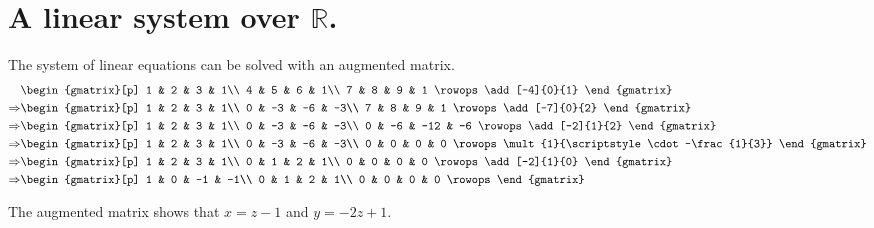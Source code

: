 \section{A linear system over $\mathbb{R}$.}
The system of linear equations can be solved with an augmented matrix.
\begin{align*}
    & \begin{gmatrix}[p]
        1 & 2 & 3 & 1\\
        4 & 5 & 6 & 1\\
        7 & 8 & 9 & 1
        \rowops
        \add[-4]{0}{1}
      \end{gmatrix} \\
    \Rightarrow 
    & \begin{gmatrix}[p]
        1 & 2 & 3 & 1\\
        0 & -3 & -6 & -3\\
        7 & 8 & 9 & 1
        \rowops
        \add[-7]{0}{2}
      \end{gmatrix} \\
    \Rightarrow 
    & \begin{gmatrix}[p]
        1 & 2 & 3 & 1\\
        0 & -3 & -6 & -3\\
        0 & -6 & -12 & -6
        \rowops
        \add[-2]{1}{2}
        \end{gmatrix} \\
    \Rightarrow 
    & \begin{gmatrix}[p]
        1 & 2 & 3 & 1\\
        0 & -3 & -6 & -3\\
        0 & 0 & 0 & 0
        \rowops
        \mult{1}{\scriptstyle \cdot -\frac{1}{3}}
        \end{gmatrix} \\
    \Rightarrow 
    & \begin{gmatrix}[p]
        1 & 2 & 3 & 1\\
        0 & 1 & 2 & 1\\
        0 & 0 & 0 & 0
        \rowops
        \add[-2]{1}{0}
        \end{gmatrix} \\
    \Rightarrow 
    & \begin{gmatrix}[p]
        1 & 0 & -1 & -1\\
        0 & 1 & 2 & 1\\
        0 & 0 & 0 & 0
        \rowops
        \end{gmatrix} \\
  \end{align*}

  The augmented matrix shows that 
  $x = z-1$ and $y = -2z+1$.